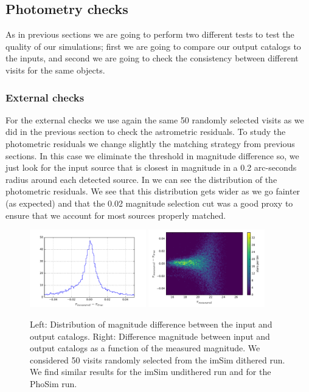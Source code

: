 \documentclass[\docopts]{\docclass}
\begin{document}
\subsection{Photometry checks}
\label{sec:photometry_checks}

As in previous sections we are going to perform two different tests to test the quality of our simulations; first we are going to
compare our output catalogs to the inputs, and second we are going to check the consistency between different visits for the same objects.

\subsubsection{External checks}
\label{sec:external_photometry}

For the external checks we use again the same 50 randomly selected visits as we did in the previous section to check the astrometric residuals.
To study the photometric residuals we change slightly the matching strategy from previous sections. In this case we eliminate the threshold
in magnitude difference so, we just look for the input source that is closest in magnitude in a 0.2 arc-seconds radius around each detected
source. In  we can see the distribution of the photometric residuals. We see that this distribution gets wider as we go
fainter (as expected) and that the 0.02 magnitude selection cut was a good proxy to ensure that we account for most sources properly matched.

\begin{figure}
  \centering
  \includegraphics[width=0.45\textwidth]{photometry_imsim_dithered_50visits_hist}
  \includegraphics[width=0.45\textwidth]{photometry_imsim_dithered_50visits}
  \caption{Left: Distribution of magnitude difference between the input and output catalogs.
  Right: Difference magnitude between input and output catalogs as a function of the measured magnitude. We considered 50 visits
  randomly selected from the imSim dithered run. We find similar results for the imSim undithered run and for the PhoSim run.}
  \label{fig:photometry_a}
\end{figure}
\end{document}
